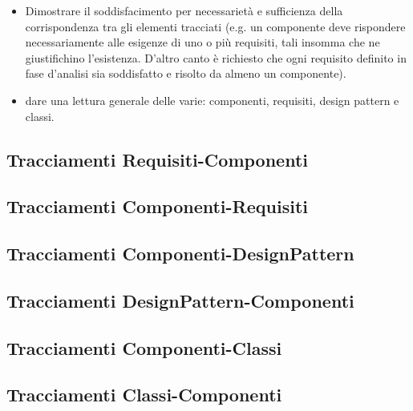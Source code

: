 \begin{itemize}
	\item Dimostrare il soddisfacimento per necessarietà e sufficienza della corrispondenza tra gli elementi tracciati (e.g. un componente deve rispondere necessariamente alle esigenze di uno o più requisiti, tali insomma che ne giustifichino l'esistenza. D'altro canto è richiesto che ogni requisito definito in fase d'analisi sia soddisfatto e risolto da almeno un componente).
	\item dare una lettura generale delle varie: componenti, requisiti, design pattern e classi.
\end{itemize}

\subsection{Tracciamenti Requisiti-Componenti}

\subsection{Tracciamenti Componenti-Requisiti}

\subsection{Tracciamenti Componenti-DesignPattern}

\subsection{Tracciamenti DesignPattern-Componenti}

\subsection{Tracciamenti Componenti-Classi}

\subsection{Tracciamenti Classi-Componenti}

